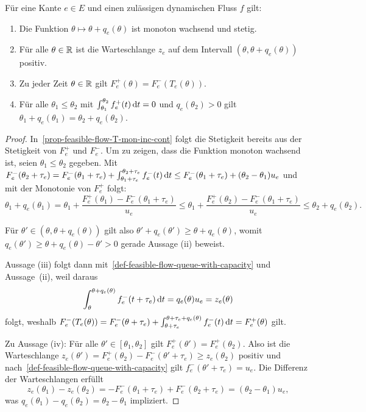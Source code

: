 \begin{proposition}\label{prop-feasible-flow}
	Für eine Kante $e\in E$ und einen zulässigen dynamischen Fluss $f$ gilt:
	\begin{enumerate}[label=(\roman*)]
		\item\label{prop-feasible-flow-T-mon-inc-cont} Die Funktion $\theta \mapsto \theta + q_e(\theta)$ ist monoton wachsend und stetig.
		\item\label{prop-feasible-flow-positive-queue} Für alle $\theta\in\mathbb{R}$ ist die Warteschlange $z_e$ auf dem Intervall $(\theta, \theta + q_e(\theta))$ positiv.
		\item\label{prop-feasible-flow-det-outflow} Zu jeder Zeit $\theta\in\mathbb{R}$ gilt $F_e^+(\theta) = F_e^-(T_e(\theta))$.
		\item\label{prop-feasible-flow-queue-delay} Für alle $\theta_1 \leq \theta_2$ mit $\int_{\theta_1}^{\theta_2} f^+_e(t) \mathop{}\!\mathrm{d} t = 0$ und $q_e(\theta_2)>0$ gilt $\theta_1 + q_e(\theta_1) = \theta_2 + q_e(\theta_2)$.
	\end{enumerate}
\end{proposition}
\begin{proof}
	In~\ref{prop-feasible-flow-T-mon-inc-cont} folgt die Stetigkeit bereits aus der Stetigkeit von $F_e^+$ und $F_e^-$.
	Um zu zeigen, dass die Funktion monoton wachsend ist, seien $\theta_1 \leq \theta_2$ gegeben.
	Mit $F_e^-(\theta_2 + \tau_e) = F_e^-(\theta_1+\tau_e) + \int_{\theta_1+\tau_e}^{\theta_2+\tau_e} f_e^-(t)\mathop{}\!\mathrm{d} t\leq F_e^-(\theta_1 + \tau_e) + (\theta_2 - \theta_1)u_e$ und mit der Monotonie von $F_e^+$ folgt: 
	\[
		\theta_1 + q_e(\theta_1)
		= \theta_1 + \frac{F_e^+(\theta_1) - F_e^-(\theta_1 + \tau_e)}{u_e}
		\leq \theta_1 + \frac{F_e^+(\theta_2) - F_e^-(\theta_1+\tau_e)}{u_e} \leq \theta_2 + q_e(\theta_2).
	\]
	
	Für $\theta'\in (\theta, \theta+q_e(\theta))$ gilt also $\theta' + q_e(\theta') \geq \theta + q_e(\theta)$, womit $q_e(\theta') \geq \theta + q_e(\theta) - \theta' > 0$ gerade Aussage (ii) beweist.
	
	Aussage (iii) folgt dann mit~\ref{def-feasible-flow-queue-with-capacity} und Aussage~(ii), weil daraus
	\[ 
	\int_{\theta}^{\theta + q_e(\theta)}f_e^-(t + \tau_e) \mathop{}\!\mathrm{d} t = q_e(\theta)  u_e = z_e(\theta)
	\]
	folgt, weshalb $F_e^-(T_e(\theta)) = F_e^-(\theta+\tau_e) + \int_{\theta+\tau_e}^{\theta+\tau_e+q_e(\theta)}f_e^-(t)\mathop{}\!\mathrm{d} t = F_e^+(\theta)$ gilt.
	
	Zu Aussage (iv):
	Für alle $\theta'\in [\theta_1, \theta_2]$ gilt $F_e^+(\theta') = F_e^+(\theta_2)$.
	Also ist die Warteschlange $z_e(\theta') = F_e^+(\theta_2) - F_e^-(\theta' + \tau_e) \geq z_e(\theta_2)$ positiv und nach~\ref{def-feasible-flow-queue-with-capacity} gilt $f_e^-(\theta' + \tau_e)=u_e$.
	Die Differenz der Warteschlangen erfüllt
	\[
	z_e(\theta_1)-z_e(\theta_2)=-F^-_e(\theta_1 + \tau_e) + F^-_e(\theta_2 + \tau_e) = (\theta_2 - \theta_1)u_e,
	\]
	was $q_e(\theta_1) - q_e(\theta_2) = \theta_2 - \theta_1$ impliziert.
\end{proof}